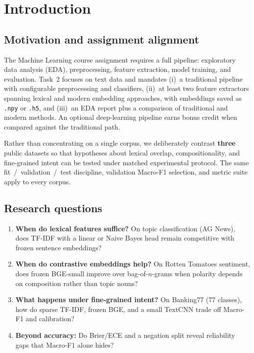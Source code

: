 \section{Introduction}

\subsection{Motivation and assignment alignment}

The Machine Learning course assignment requires a full pipeline: exploratory data analysis (EDA), preprocessing, feature extraction, model training, and evaluation. Task~2 focuses on text data and mandates (i)~a traditional pipeline with configurable preprocessing and classifiers, (ii)~at least two feature extractors spanning lexical and modern embedding approaches, with embeddings saved as \texttt{.npy} or \texttt{.h5}, and (iii)~an EDA report plus a comparison of traditional and modern methods. An optional deep-learning pipeline earns bonus credit when compared against the traditional path.

Rather than concentrating on a single corpus, we deliberately contrast \textbf{three} public datasets so that hypotheses about lexical overlap, compositionality, and fine-grained intent can be tested under matched experimental protocol. The same fit~/~validation~/~test discipline, validation Macro-F1 selection, and metric suite apply to every corpus.

\subsection{Research questions}

\begin{enumerate}
  \item \textbf{When do lexical features suffice?} On topic classification (AG News), does TF-IDF with a linear or Naive Bayes head remain competitive with frozen sentence embeddings?
  \item \textbf{When do contrastive embeddings help?} On Rotten Tomatoes sentiment, does frozen BGE-small improve over bag-of-$n$-grams when polarity depends on composition rather than topic nouns?
  \item \textbf{What happens under fine-grained intent?} On Banking77 (77 classes), how do sparse TF-IDF, frozen BGE, and a small TextCNN trade off Macro-F1 and calibration?
  \item \textbf{Beyond accuracy:} Do Brier/ECE and a negation split reveal reliability gaps that Macro-F1 alone hides?
\end{enumerate}

